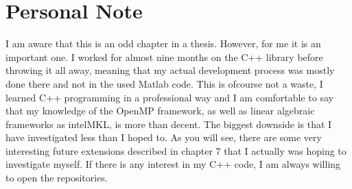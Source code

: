 \section{Personal Note}
I am aware that this is an odd chapter in a thesis. 
However, for me it is an important one. 
I worked for almost nine months on the C++ library before throwing it all away, meaning that my actual development process was mostly done there and not in the used Matlab code.
This is ofcourse not a waste, I learned C++ programming in a professional way and I am comfortable to say that my knowledge of the OpenMP framework, as well as linear algebraic frameworks as intelMKL, is more than decent.
The biggest downside is that I have investigated less than I hoped to. 
As you will see, there are some very interesting future extensions described in chapter 7 that I actually was hoping to investigate myself.
If there is any interest in my C++ code, I am always willing to open the repositories.


